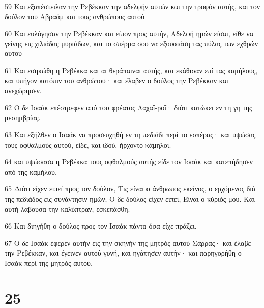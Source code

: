 \par 59 Και εξαπέστειλαν την Ρεβέκκαν την αδελφήν αυτών και την τροφόν αυτής, και τον δούλον του Αβραάμ και τους ανθρώπους αυτού
\par 60 Και ευλόγησαν την Ρεβέκκαν και είπον προς αυτήν, Αδελφή ημών είσαι, είθε να γείνης εις χιλιάδας μυριάδων, και το σπέρμα σου να εξουσιάση τας πύλας των εχθρών αυτού
\par 61 Και εσηκώθη η Ρεβέκκα και αι θεράπαιναι αυτής, και εκάθισαν επί τας καμήλους, και υπήγον κατόπιν του ανθρώπου· και έλαβεν ο δούλος την Ρεβέκκαν και ανεχώρησεν.
\par 62 Ο δε Ισαάκ επέστρεφεν από του φρέατος Λαχαΐ-ροΐ· διότι κατώκει εν τη γη της μεσημβρίας.
\par 63 Και εξήλθεν ο Ισαάκ να προσευχηθή εν τη πεδιάδι περί το εσπέρας· και υψώσας τους οφθαλμούς αυτού, είδε, και ιδού, ήρχοντο κάμηλοι.
\par 64 και υψώσασα η Ρεβέκκα τους οφθαλμούς αυτής είδε τον Ισαάκ και κατεπήδησεν από της καμήλου.
\par 65 Διότι είχεν ειπεί προς τον δούλον, Τις είναι ο άνθρωπος εκείνος, ο ερχόμενος διά της πεδιάδος εις συνάντησιν ημών; Ο δε δούλος είχεν ειπεί, Είναι ο κύριός μου. Και αυτή λαβούσα την καλύπτραν, εσκεπάσθη.
\par 66 Και διηγήθη ο δούλος προς τον Ισαάκ πάντα όσα είχε πράξει.
\par 67 Ο δε Ισαάκ έφερεν αυτήν εις την σκηνήν της μητρός αυτού Σάρρας· και έλαβε την Ρεβέκκαν, και έγεινεν αυτού γυνή, και ηγάπησεν αυτήν· και παρηγορήθη ο Ισαάκ περί της μητρός αυτού.

\chapter{25}

